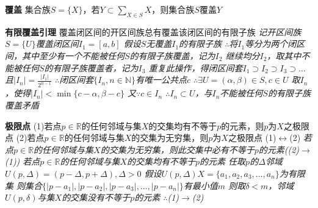 \documentclass[11pt]{article}
\begin{document}
\textbf{覆盖} \newline
集合族$S=\{X\}$，若$Y\subset\sum\limits_{X\in S}X$，则集合族$S$覆盖$Y$ \newline

\textbf{有限覆盖引理} \newline
覆盖闭区间的开区间族总有覆盖该闭区间的有限子族 \newline
\textit{记开区间族$S=\{U\}$覆盖闭区间$I_1=[a,b]$ \newline
假设$S$无覆盖$I_1$的有限子族 \newline
$\therefore$将$I_1$等分为两个闭区间，其中至少有一个不能被任何$S$的有限子族覆盖，记为$I_2$ \newline
继续均分$I_2$，取其中不能被任何$S$的有限子族覆盖者，记为$I_3$ \newline
重复此操作，得闭区间套$I_1\supset I_2\supset I_3\supset\dots$ \newline
且$|I_n|=\frac{|I_1|}{2^{n-1}}$ \newline
$\therefore$闭区间套$\{I_n,n\in\mathbb{N}\}$有唯一公共点$c$ \newline
$\therefore \exists U=(\alpha,\beta)\in S, c\in U$ \newline
取$I_n$，使得$|I_n|<\min\{c-\alpha,\beta-c\}$ \newline
又$\because c\in I_n$ \newline
$\therefore$$I_n\subset U$，与$I_n$不能被任何$S$的有限子族覆盖矛盾} \newline

\textbf{极限点} \newline
(1)若点$p\in\mathbb{R}$的任何邻域与集$X$的交集均有不等于$p$的元素，则$p$为$X$之极限点 \newline
(2)若点$p\in\mathbb{R}$的任何邻域与集$X$的交集为无穷集，则$p$为$X$之极限点 \newline
(1)$\longleftrightarrow$(2) \newline
\textit{若点$p\in\mathbb{R}$的任何邻域与集$X$的交集为无穷集，则此交集中必有不等于$p$的元素((2)$\rightarrow$(1)) \newline
若点$p\in\mathbb{R}$的任何邻域与集$X$的交集均有不等于$p$的元素 \newline
任取$p$的$\Delta$邻域$U(p,\Delta)=(p-\Delta,p+\Delta), \Delta>0$ \newline
假设$U(p,\Delta)X=\{a_1,a_2,a_3,\dots,a_n\}$为有限集 \newline
则集合$\{|p-a_1|,|p-a_2|,|p-a_3|,\dots,|p-a_n|\}$有最小值$m$ \newline
则取$\delta<m$，邻域$U(p,\delta)$与集$X$的交集没有不等于$p$的元素 \newline
$\therefore$(1)$\rightarrow$(2)} \newline
\end{document}
